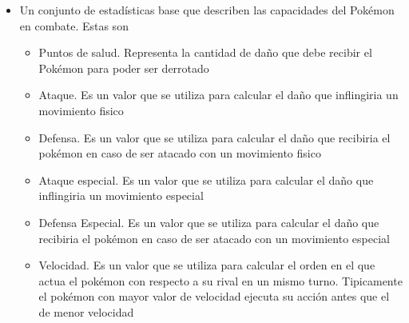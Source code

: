 \begin{itemize}
\begin{itemize}
    \end{itemize}
    \item Un conjunto de estadísticas base que describen las capacidades del Pokémon en combate. Estas son
    \begin{itemize}
        \item Puntos de salud. Representa la cantidad de daño que debe recibir el Pokémon para poder ser derrotado
        \item Ataque. Es un valor que se utiliza para calcular el daño que inflingiria un movimiento fisico
        \item Defensa. Es un valor que se utiliza para calcular el daño que recibiria el pokémon en caso de ser atacado con un movimiento fisico
        \item Ataque especial. Es un valor que se utiliza para calcular el daño que inflingiria un movimiento especial
        \item Defensa Especial. Es un valor que se utiliza para calcular el daño que recibiria el pokémon en caso de ser atacado con un movimiento especial
        \item Velocidad. Es un valor que se utiliza para calcular el orden en el que actua el pokémon con respecto a su rival en un mismo turno. Tipicamente el pokémon con mayor valor de velocidad ejecuta su acción antes que el de menor velocidad
    \end{itemize}
\end{itemize}

